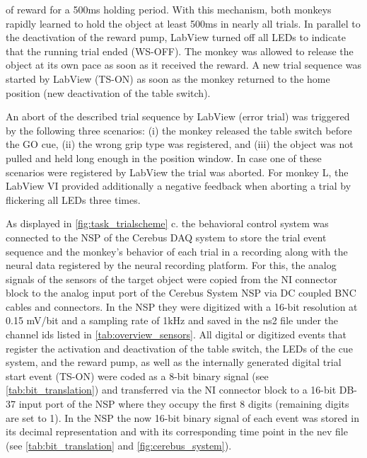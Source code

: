 {of reward for a 500ms holding period. With this mechanism, both monkeys rapidly learned to hold the object at least 500ms in nearly all trials. In parallel to the deactivation of the reward pump, LabView turned off all LEDs to indicate that the running trial ended (WS-OFF). The monkey was allowed to release the object at its own pace as soon as it received the reward. A new trial sequence was started by LabView (TS-ON) as soon as the monkey returned to the home position (new deactivation of the table switch).

An abort of the described trial sequence by LabView (error trial) was triggered by the following three scenarios: (i) the monkey released the table switch before the GO cue, (ii) the wrong grip type was registered, and (iii) the object was not pulled and held long enough in the position window. In case one of these scenarios were registered by LabView the trial was aborted. For monkey L, the LabView VI provided additionally a negative feedback when aborting a trial by flickering all LEDs three times. 

As displayed in \cref{fig:task_trialscheme} c. the behavioral control system was connected to the NSP of the Cerebus DAQ system to store the trial event sequence and the monkey's behavior of each trial in a recording along with the neural data registered by the neural recording platform. For this, the analog signals of the sensors of the target object were copied from the NI connector block to the analog input port of the Cerebus System NSP via DC coupled BNC cables and connectors. In the NSP they were digitized with a 16-bit resolution at 0.15 mV/bit and a sampling rate of 1kHz and saved in the ns2 file under the channel ids listed in \cref{tab:overview_sensors}. All digital or digitized events that register the activation and deactivation of the table switch, the LEDs of the cue system, and the reward pump, as well as the internally generated digital trial start event (TS-ON) were coded as a 8-bit binary signal (see \cref{tab:bit_translation}) and transferred via the NI connector block to a 16-bit DB-37 input port of the NSP where they occupy the first 8 digits (remaining digits are set to 1). In the NSP the now 16-bit binary signal of each event was stored in its decimal representation and with its corresponding time point in the nev file (see \cref{tab:bit_translation} and \cref{fig:cerebus_system}).

}
